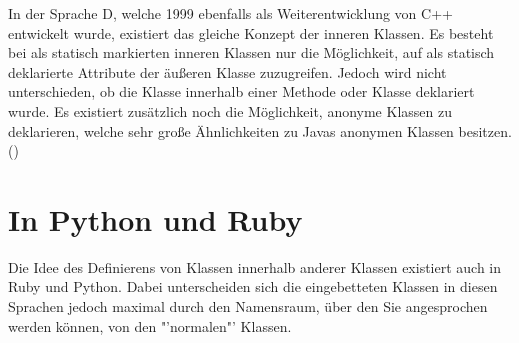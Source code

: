 In der Sprache D, welche 1999 ebenfalls als Weiterentwicklung von C++ entwickelt wurde, existiert das gleiche Konzept der inneren Klassen.
Es besteht bei als statisch markierten
inneren Klassen nur die Möglichkeit, auf als statisch deklarierte Attribute der äußeren
Klasse zuzugreifen. Jedoch wird nicht unterschieden, ob die Klasse innerhalb einer Methode oder Klasse deklariert wurde.
Es existiert zusätzlich noch die Möglichkeit, anonyme Klassen zu deklarieren, welche sehr große Ähnlichkeiten zu Javas anonymen Klassen besitzen.(\cite{D:langSpec})

\section{In Python und Ruby}

Die Idee des Definierens von Klassen innerhalb anderer Klassen existiert auch in Ruby und Python.
Dabei unterscheiden sich die eingebetteten Klassen in diesen Sprachen jedoch maximal durch den Namensraum,
über den Sie angesprochen werden können, von den "'normalen"' Klassen.
